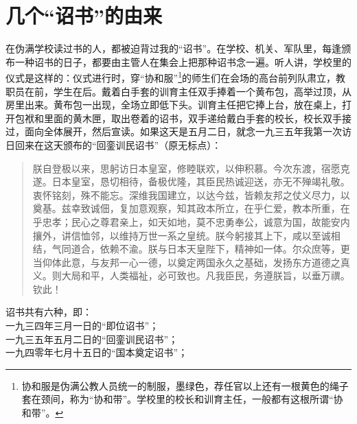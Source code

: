 \fancyhead[RO]{} %
\fancyhead[LE]{} %
\chapter*{几个“诏书”的由来}
\thispagestyle{empty}
在伪满学校读过书的人，都被迫背过我的“诏书”。在学校、机关、军队里，每逢颁布一种诏书的日子，都要由主管人在集会上把那种诏书念一遍。听人讲，学校里的仪式是这样的：仪式进行时，穿“协和服”\footnote{协和服是伪满公教人员统一的制服，墨绿色，荐任官以上还有一根黄色的绳子套在颈间，称为“协和带”。学校里的校长和训育主任，一般都有这根所谓“协和带”。}的师生们在会场的高台前列队肃立，教职员在前，学生在后。戴着白手套的训育主任双手捧着一个黄布包，高举过顶，从房里出来。黄布包一出现，全场立即低下头。训育主任把它捧上台，放在桌上，打开包袱和里面的黄木匣，取出卷着的诏书，双手递给戴白手套的校长，校长双手接过，面向全体展开，然后宣读。如果这天是五月二日，就念一九三五年我第一次访日回来在这天颁布的“回銮训民诏书”（原无标点）：\\

\begin{quote}
	朕自登极以来，思躬访日本皇室，修睦联欢，以伸积慕。今次东渡，宿愿克遂。日本皇室，恳切相待，备极优隆，其臣民热诚迎送，亦无不殚竭礼敬。衷怀铭刻，殊不能忘。深维我国建立，以达今兹，皆赖友邦之仗义尽力，以奠基。兹幸致诚佃，复加意观察，知其政本所立，在乎仁爱，教本所重，在乎忠孝；民心之尊君亲上，如天如地，莫不忠勇奉公，诚意为国，故能安内攘外，讲信恤邻，以维持万世一系之皇统。朕今躬接其上下，咸以至诚相结，气同道合，依赖不渝。朕与日本天皇陛下，精神如一体。尔众庶等，更当仰体此意，与友邦一心一德，以奠定两国永久之基础，发扬东方道德之真义。则大局和平，人类福祉，必可致也。凡我臣民，务遵朕旨，以垂万禩。钦此！\\
\end{quote}

诏书共有六种，即：\\

一九三四年三月一日的“即位诏书”；\\

一九三五年五月二日的“回銮训民诏书”；\\

一九四零年七月十五日的“国本奠定诏书”；\\

